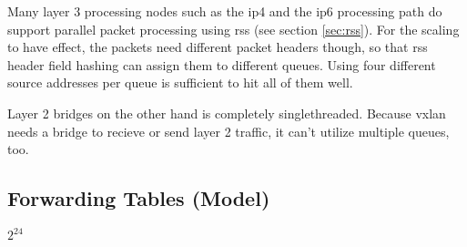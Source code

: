 Many layer 3 processing nodes such as the \Ac{ip4} and the \Ac{ip6}
processing path do support parallel packet processing using \Ac{rss}
(see section \ref{sec:rss}). For the scaling to have effect, the
packets need different packet headers though, so that \Ac{rss} header
field hashing can assign them to different queues. Using four
different source addresses per queue is sufficient to hit all of them
well.

Layer 2 bridges on the other hand is completely singlethreaded.
Because \Ac{vxlan} needs a bridge to recieve or send layer 2 traffic,
it can't utilize multiple queues, too.







\subsection{Forwarding Tables (Model)}

$2^{24}$


